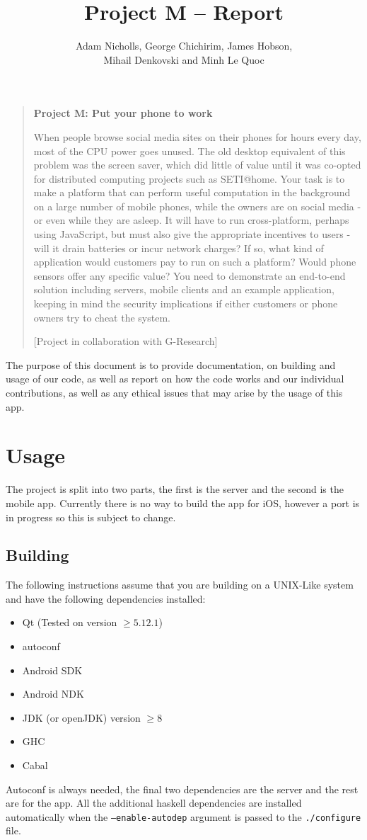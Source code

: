 \documentclass{article}
\title{Project M -- Report}
\author{Adam Nicholls, George Chichirim, James Hobson, \\ Mihail Denkovski and Minh Le Quoc}
\begin{document}
\maketitle
\begin{quote}
  \textbf{Project M: Put your phone to work}

When people browse social media sites on their phones for hours every day, most of the CPU power goes unused. The old desktop equivalent of this problem was the screen saver, which did little of value until it was co-opted for distributed computing projects such as SETI@home. Your task is to make a platform that can perform useful computation in the background on a large number of mobile phones, while the owners are on social media - or even while they are asleep. It will have to run cross-platform, perhaps using JavaScript, but must also give the appropriate incentives to users - will it drain batteries or incur network charges? If so, what kind of application would customers pay to run on such a platform? Would phone sensors offer any specific value? You need to demonstrate an end-to-end solution including servers, mobile clients and an example application, keeping in mind the security implications if either customers or phone owners try to cheat the system.

[Project in collaboration with G-Research]
\end{quote}
The purpose of this document is to provide documentation, on building and usage of our code, as well as report on how the
code works and our individual contributions, as well as any ethical issues that may arise by the usage of this app.
\tableofcontents
\section{Usage}
The project is split into two parts, the first is the server and the second is the mobile app. Currently there is no way
to build the app for iOS, however a port is in progress so this is subject to change.
\subsection{Building}
The following instructions assume that you are building on a UNIX-Like system and have the following dependencies installed:
\begin{itemize}
  \item{Qt (Tested on version \(\geq 5.12.1\))}
  \item{autoconf}
  \item{Android SDK}
  \item{Android NDK}
  \item{JDK (or openJDK) version \(\geq 8\)}
  \item{GHC}
  \item{Cabal}
\end{itemize}
Autoconf is always needed, the final two dependencies are the server and the rest are for the app. All the additional haskell dependencies are installed
automatically when the \texttt{--enable-autodep} argument is passed to the \texttt{./configure} file.
\end{document}
